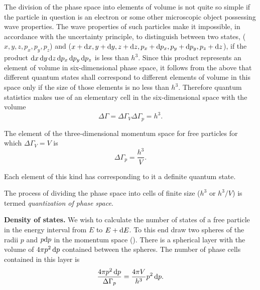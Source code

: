 The division of the phase space into elements of volume is not quite so simple if the particle in question is an electron or some other microscopic object possessing wave properties. The wave properties of such particles make it impossible, in accordance with the uncertainty principle, to distinguish between two states, ($x, y, z, p_x, p_y, p_z$) and ($x+\mathrm{d} x, y+\mathrm{d} y, z+\mathrm{d} z, p_x+\mathrm{d} p_x, p_y+\mathrm{d} p_y, p_z+\mathrm{d} z$), if the product $\mathrm{d} x\,\mathrm{d} y\,\mathrm{d} z\, \mathrm{d} p_x\,\mathrm{d} p_y\,\mathrm{d} p_z$ is less than $h^3$. Since this product represents an element of volume in six-dimensional phase space, it follows from the above that different quantum states shall correspond to different elements of volume in this space only if the size of those elements is no less than $h^3$. Therefore quantum statistics makes use of an elementary cell in the six-dimensional space with the volume
\begin{equation}\label{eq:3_15}
    \Delta{\Gamma} = \Delta{\Gamma}_V \Delta{\Gamma}_p = h^3.
\end{equation}

\noindent
The element of the three-dimensional momentum space for free particles for which $\Delta{\Gamma}_V=V$ is
\begin{equation}\label{eq:3_16}
    \Delta{\Gamma}_p = \frac{h^3}{V}.
\end{equation}

\noindent
Each element of this kind has corresponding to it a definite quantum state.

The process of dividing the phase space into cells of finite size ($h^3$ or $h^3/V$) is termed \textit{quantization of phase space}.

\textbf{Density of states.} We wish to calculate the number of states of a free particle in the energy interval from $E$ to $E+\mathrm{d} E$. To this end draw two spheres of the radii $p$ and $p\mathrm{d} p$ in the momentum space (). There is a spherical layer with the volume of $4\pi p^2\,\mathrm{d} p$ contained between the spheres. The number of phase cells contained in this layer is
\begin{equation}\label{eq:3_17}
    \frac{4\pi p^2\, \mathrm{d} p}{\Delta{\Gamma}_p} = \frac{4\pi V}{h^3}p^2\, \mathrm{d} p.
\end{equation}

